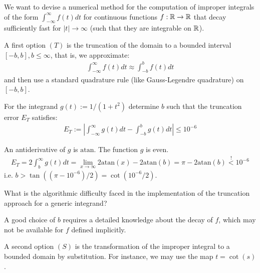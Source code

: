 \begin{problem} 

 We want to devise a numerical method for the computation of improper integrals of the form $\int_{-\infty}^{\infty} f(t) dt$ for continuous functions $f: \mathbb{R} \rightarrow \mathbb{R}$ that decay sufficiently fast for $\lvert t \rvert \rightarrow \infty$ (such that they are integrable on $\mathbb{R}$). 
 
 A first option $(T)$ is the truncation of the domain to a bounded interval $[-b,b], b \leq \infty$, that is, we approximate:
 \begin{align*}
  \int_{-\infty}^{\infty} f(t) dt \approx \int_{-b}^{b} f(t) dt
 \end{align*}
 and then use a standard quadrature rule (like Gauss-Legendre quadrature) on $[-b,b]$.
 
 \begin{subproblem}[1]
  For the integrand $g(t) := 1 / (1 + t^2)$ determine $b$ such that the truncation error $E_T$ satisfies:
  \begin{align}
   E_T := \left\lvert  \int_{-\infty}^{\infty} g(t) dt - \int_{-b}^{b} g(t) dt \right \rvert \leq 10^{-6}
  \end{align}
  \begin{solution}
  An antiderivative of $g$ is $\mathrm{atan}$. The function $g$ is even.
  \begin{align}
   E_T = 2 \int_b^\infty g(t) dt = \lim_{x \rightarrow \infty} 2 \mathrm{atan}(x) - 2 \mathrm{atan}(b) = \pi - 2 \mathrm{atan}(b) \overset{!}{<} 10^{-6}
  \end{align}
  i.e. $b > \tan((\pi -10^{-6}) / 2) = \cot(10^{-6} / 2)$.
  \end{solution}
 \end{subproblem}
 
 \begin{subproblem}[1]
  What is the algorithmic difficulty faced in the implementation of the truncation approach for a generic integrand?
  \begin{solution}
   A good choice of $b$ requires a detailed knowledge about the decay of $f$, which may not be available for $f$ defined implicitly.
  \end{solution}
 \end{subproblem}

 A second option $(S)$ is the transformation of the improper integral to a bounded domain by substitution. For instance, we may use the map $t = \cot(s)$.
 

\end{problem}

